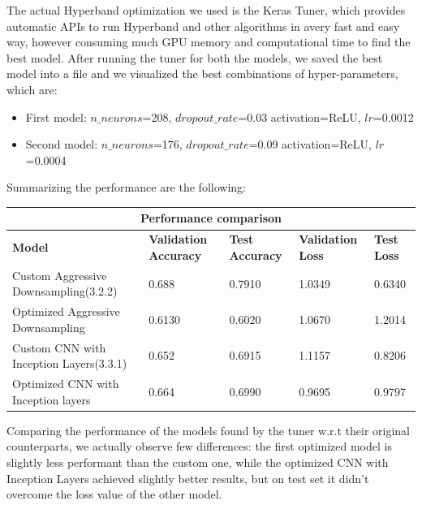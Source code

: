 The actual Hyperband optimization we used is the Keras Tuner, which provides automatic APIs to run Hyperband and other algorithms in avery fast and easy way, however consuming much GPU memory and computational time to find the best model. After running the tuner for both the models, we saved the best model into a file and we visualized the best combinations of hyper-parameters, which are:
\begin{itemize}
\item First model: $n\_neurons$=208, $dropout\_rate$=0.03 activation=ReLU, $lr$=0.0012
\item Second model: $n\_neurons$=176, $dropout\_rate$=0.09 activation=ReLU, $lr$=0.0004
\end{itemize}

Summarizing the performance are the following:


\begin{tabular}{ |p{5cm}|p{2cm}|p{2cm}|p{2cm}|p{2cm}|  }
\hline
\multicolumn{5}{|c|}{Performance comparison} \\
\hline
\textbf{Model} & \textbf{Validation Accuracy} & \textbf{Test Accuracy} & \textbf{Validation Loss} & \textbf{Test Loss} \\
\hline
Custom Aggressive Downsampling(3.2.2) & 0.688 & 0.7910 & 1.0349 & 0.6340\\
\hline
Optimized Aggressive Downsampling & 0.6130 & 0.6020 & 1.0670 & 1.2014\\
\hline
Custom CNN with Inception Layers(3.3.1) & 0.652 & 0.6915 & 1.1157 & 0.8206\\
\hline
Optimized CNN with Inception layers & 0.664 & 0.6990 & 0.9695 & 0.9797\\
\hline
\end{tabular}

\medskip 

\noindent Comparing the performance of the models found by the tuner w.r.t their original counterparts, we actually observe few differences: the first optimized model is slightly less performant than the custom one, while the optimized CNN with Inception Layers achieved slightly better results, but on test set it didn't overcome the loss value of the other model.

